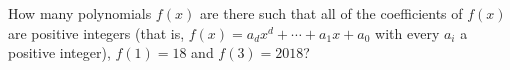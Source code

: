 How many polynomials $f(x)$ are there such that all of the coefficients of $f(x)$ are positive integers (that is, $f(x)=a_dx^d+\cdots+a_1x+a_0$ with every $a_i$ a positive integer), $f(1)=18$ and $f(3)=2018$?
